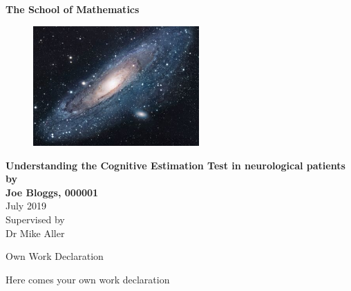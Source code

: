 \documentclass[11pt,twoside]{article}
\numberwithin{Theorem}{section}
\numberwithin{Definition}{section}
\numberwithin{Lemma}{section}
\numberwithin{Algorithm}{section}
\numberwithin{equation}{section}
\begin{document}
\pagestyle{empty}

\begin{titlepage}
\vspace*{.5em}
\center
\textbf{\large{The School of Mathematics}} \\
\vspace*{1em}
\begin{figure}[!h]
\centering
\includegraphics[width=180pt]{universe.jpg}
\end{figure}
\vspace{2em}
\textbf{\Huge{Understanding the Cognitive Estimation Test in neurological patients}}\\[2em]
\textbf{\LARGE{by}}\\
\vspace{2em}
\textbf{\LARGE{Joe Bloggs, 000001}}\\
\vspace{6.5em}
\vspace{6.5em}
\Large{July 2019}\\
\vspace{3em}
\normalsize{Supervised by\\Dr Mike Aller}
\vfill
\end{titlepage}

\clearpage





\begin{center}
\Large{Own Work Declaration}
\end{center}
Here comes your own work declaration
\end{document}
